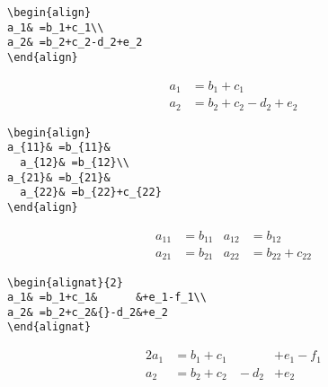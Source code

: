 \begin{table}[!htbp]
\begin{makeimage}
\begin{minipage}{\textwidth}
\begin{eqxample}
\begin{verbatim}
\begin{align}
a_1& =b_1+c_1\\
a_2& =b_2+c_2-d_2+e_2
\end{align}
\end{verbatim}
\producing
\begin{align}
a_1& =b_1+c_1\\
a_2& =b_2+c_2-d_2+e_2
\end{align}
\end{eqxample}

\begin{eqxample}
\begin{verbatim}
\begin{align}
a_{11}& =b_{11}&
  a_{12}& =b_{12}\\
a_{21}& =b_{21}&
  a_{22}& =b_{22}+c_{22}
\end{align}
\end{verbatim}
\producing
\begin{align}
a_{11}& =b_{11}&
  a_{12}& =b_{12}\\
a_{21}& =b_{21}&
  a_{22}& =b_{22}+c_{22}
\end{align}
\end{eqxample}

\begin{eqxample}
\begin{verbatim}
\begin{alignat}{2}
a_1& =b_1+c_1&      &+e_1-f_1\\
a_2& =b_2+c_2&{}-d_2&+e_2
\end{alignat}
\end{verbatim}
\producing
\begin{alignat}{2}
a_1& =b_1+c_1&      &+e_1-f_1\\
a_2& =b_2+c_2&{}-d_2&+e_2
\end{alignat}
\end{eqxample}


\end{minipage}
\end{makeimage}
\end{table}
